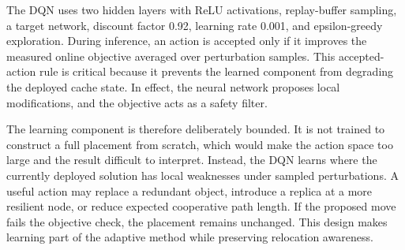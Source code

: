 The DQN uses two hidden layers with ReLU activations, replay-buffer sampling, a target network, discount factor 0.92, learning rate 0.001, and epsilon-greedy exploration. During inference, an action is accepted only if it improves the measured online objective averaged over perturbation samples. This accepted-action rule is critical because it prevents the learned component from degrading the deployed cache state. In effect, the neural network proposes local modifications, and the objective acts as a safety filter.

The learning component is therefore deliberately bounded. It is not trained to construct a full placement from scratch, which would make the action space too large and the result difficult to interpret. Instead, the DQN learns where the currently deployed solution has local weaknesses under sampled perturbations. A useful action may replace a redundant object, introduce a replica at a more resilient node, or reduce expected cooperative path length. If the proposed move fails the objective check, the placement remains unchanged. This design makes learning part of the adaptive method while preserving relocation awareness.

